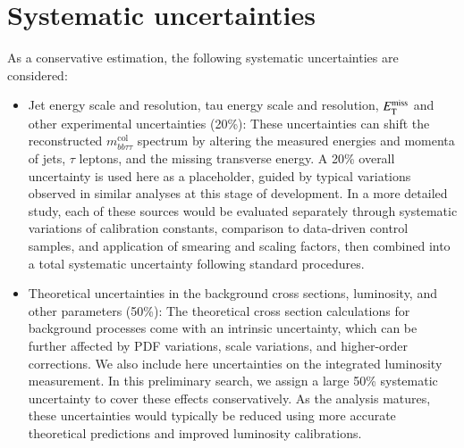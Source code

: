 \section{Systematic uncertainties}\label{sec:grav:sys}
    As a conservative estimation, the following systematic uncertainties are considered:
    \begin{itemize}
        \item Jet energy scale and resolution, tau energy scale and resolution, \(E_{\text{T}}^{\text{miss}}\) and other experimental uncertainties (20\%): 
            These uncertainties can shift the reconstructed \( m_{bb\tau\tau}^{\text{col}} \) spectrum by altering the measured energies 
            and momenta of jets, \(\tau\) leptons, and the missing transverse energy. A 20\% overall uncertainty is used here as a 
            placeholder, guided by typical variations observed in similar analyses at this stage of development. 
            In a more detailed study, each of these sources would be evaluated separately through systematic variations 
            of calibration constants, comparison to data-driven control samples, and application of smearing 
            and scaling factors, then combined into a total systematic uncertainty following standard procedures.
        
        \item Theoretical uncertainties in the background cross sections, luminosity, and other parameters (50\%):
            The theoretical cross section calculations for background processes come with an intrinsic uncertainty, 
            which can be further affected by PDF variations, scale variations, and higher-order corrections. 
            We also include here uncertainties on the integrated luminosity measurement. 
            In this preliminary search, we assign a large 50\% systematic uncertainty to cover these effects conservatively. 
            As the analysis matures, these uncertainties would typically be reduced using more accurate theoretical 
            predictions and improved luminosity calibrations.
        

\end{itemize}
